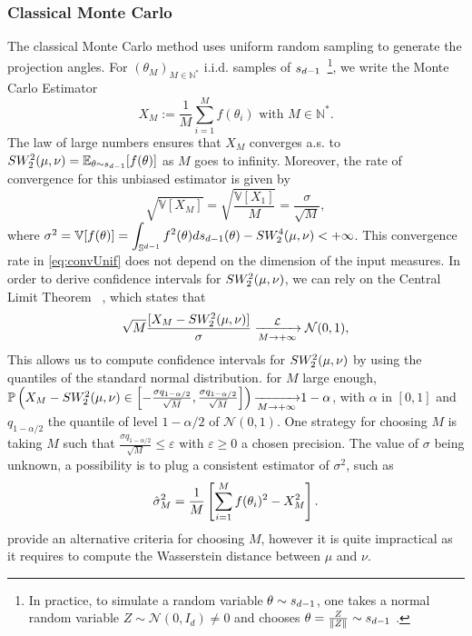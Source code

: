\subsubsection{Classical Monte Carlo} \label{sec:unif}

{The classical Monte Carlo method uses uniform random sampling to generate the projection angles. 
For $(\theta_M)_{M\in\mathbb{N}^*}$ i.i.d. samples of $s_{d-1}$~\footnote{In practice, to simulate a random variable $\theta\sim s_{d-1}$, one takes a normal random variable $Z\sim\mathcal{N}(0, I_d)\neq 0$ and chooses $\theta = \frac{Z}{\| Z \|} \sim s_{d-1}$ \citep{asmussen2007stochastic}.}, we write the Monte Carlo Estimator 
\begin{equation}
    X_M :=\displaystyle\frac{1}{M}\sum\limits_{i = 1}^{M} f(\theta_i) \text{ with } M\in\mathbb{N}^* . 
    \label{eq:mcestimator}
\end{equation}
The law of large numbers ensures that $X_M$ converges a.s. to $SW_2^2(\mu,\nu) = \mathbb{E}_{\theta \sim s_{d-1}}[f(\theta)]$ as $M$ goes to infinity. Moreover, the rate of convergence for this unbiased estimator  is given by 
\begin{equation}\label{eq:convUnif}
    \sqrt{\mathbb{V}[X_M]} = \sqrt{\frac {\mathbb{V}[X_1]}{M}} = \frac {{\sigma}}{\sqrt{M}},
    \end{equation}
where $\sigma^2 = \mathbb{V}[f(\theta)] = \displaystyle\int_{\mathbb{S}^{d-1}} f^2(\theta) ds_{d-1}(\theta) - SW_{2}^{4}(\mu,\nu) < +\infty$.
{This convergence rate in \autoref{eq:convUnif} does not depend on the dimension of the input measures}. 
In order to derive confidence intervals for $SW_2^2(\mu,\nu)$, we can rely on the Central Limit Theorem~\citep{fischer2010history} , which states that 
\begin{equation*}\label{eq:CLTSW}
    \sqrt{M}\frac{[X_M - SW_2^2(\mu,\nu)]}{\mathbb{\sigma}} \xrightarrow[M\rightarrow +\infty]{\mathcal{L}} \mathcal{N}(0,1),
\end{equation*}
This allows us to compute confidence intervals for $SW_2^2(\mu,\nu)$ by using the quantiles of the standard normal distribution.}
 for $M$ large enough,  $\mathbb{P}\left(X_M - SW_2^2(\mu,\nu) \in \left[  -\frac{\sigma q_{1 - \alpha/2}}{\sqrt{M}} , \frac{\sigma q_{1 - \alpha/2}}{\sqrt{M}}\right]\right) {\xrightarrow[M\rightarrow +\infty]{}} 1 - \alpha$, with $\alpha$ in $[0,1]$  and $q_{1 - \alpha/2}$ the quantile {of level $1 - \alpha /2$} of $\mathcal{N}(0,1)$. 
One strategy for choosing $M$ is taking $M$ such that $\frac{\sigma q_{1 - \alpha/2}}{\sqrt{M}} \leq \varepsilon$ with $\varepsilon\geq 0$ a chosen {precision}.  The value of $\sigma$ being unknown, a possibility is to plug a consistent  estimator of $\sigma^2$, such as
$$\hat{\mathbb{\sigma}}_M^2 = \frac{1}{M}\left[\displaystyle\sum\limits_{i = 1}^M f(\theta_i)^2 - X_M^2\right].$$
\citet{xu2022central} provide an alternative criteria for choosing $M$, however it is quite impractical as it {requires} to compute the Wasserstein distance between $\mu$ and $\nu$.


